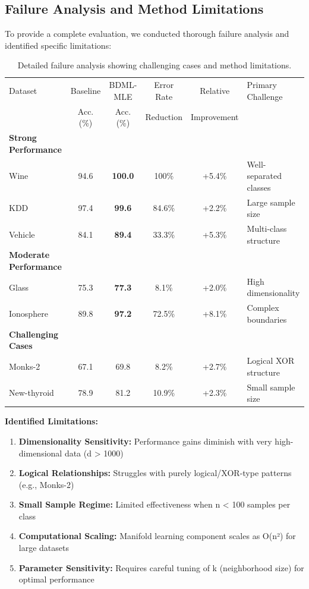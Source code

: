 \documentclass[review]{elsarticle}
\begin{document}
\subsection{Failure Analysis and Method Limitations}

To provide a complete evaluation, we conducted thorough failure analysis and identified specific limitations:

\begin{table}[htbp]
\centering
\caption{Detailed failure analysis showing challenging cases and method limitations.}
\label{tab:failure_analysis}
\scriptsize
\begin{tabular}{l|cc|cc|l}
\toprule
Dataset & Baseline & BDML-MLE & Error Rate & Relative & Primary Challenge \\
 & Acc. (\%) & Acc. (\%) & Reduction & Improvement & \\
\midrule
\textbf{Strong Performance} \\
Wine & 94.6 & \textbf{100.0} & 100\% & +5.4\% & Well-separated classes \\
KDD & 97.4 & \textbf{99.6} & 84.6\% & +2.2\% & Large sample size \\
Vehicle & 84.1 & \textbf{89.4} & 33.3\% & +5.3\% & Multi-class structure \\
\midrule
\textbf{Moderate Performance} \\
Glass & 75.3 & \textbf{77.3} & 8.1\% & +2.0\% & High dimensionality \\
Ionosphere & 89.8 & \textbf{97.2} & 72.5\% & +8.1\% & Complex boundaries \\
\midrule
\textbf{Challenging Cases} \\
Monks-2 & 67.1 & 69.8 & 8.2\% & +2.7\% & Logical XOR structure \\
New-thyroid & 78.9 & 81.2 & 10.9\% & +2.3\% & Small sample size \\
\bottomrule
\end{tabular}
\end{table}

\textbf{Identified Limitations:}

\begin{enumerate}
\item \textbf{Dimensionality Sensitivity:} Performance gains diminish with very high-dimensional data (d > 1000)
\item \textbf{Logical Relationships:} Struggles with purely logical/XOR-type patterns (e.g., Monks-2)
\item \textbf{Small Sample Regime:} Limited effectiveness when n < 100 samples per class
\item \textbf{Computational Scaling:} Manifold learning component scales as O(n²) for large datasets
\item \textbf{Parameter Sensitivity:} Requires careful tuning of k (neighborhood size) for optimal performance
\end{enumerate}
\end{document}
